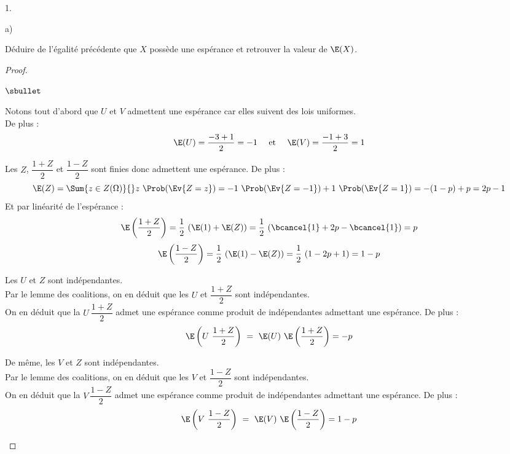\begin{noliste}{1.}
\begin{noliste}{a)}
    \newpage


  \item Déduire de l'égalité précédente que $X$ possède une espérance
    et retrouver la valeur de $\E(X)$.

    \begin{proof}~
      \begin{noliste}{$\sbullet$}
      \item Notons tout d'abord que $U$ et $V$ admettent une espérance
        car elles suivent des lois uniformes. \\
        De plus :
        \[
        \E(U) = \dfrac{-3 + 1}{2} = -1 \quad \text{ et } \quad \E(V) =
        \dfrac{-1 + 3}{2} = 1
        \]
      \item Les \var $Z$, $\dfrac{1+Z}{2}$ et $\dfrac{1-Z}{2}$ sont
        finies donc admettent une espérance. De plus :
        \[
        \E(Z) = \Sum{z \in Z(\Omega)}{} z \ \Prob(\Ev{Z = z}) = -1 \
        \Prob(\Ev{Z = -1}) + 1 \ \Prob(\Ev{Z = 1}) = -(1-p) + p = 2p-1
        \]
        Et par linéarité de l'espérance :
        \[
        \E\left(\dfrac{1+Z}{2}\right) = \dfrac{1}{2} \ (\E(1) + \E(Z)) =
        \dfrac{1}{2} \ (\bcancel{1} + 2p -\bcancel{1}) = p
        \]
        \[
        \E\left(\dfrac{1-Z}{2}\right) = \dfrac{1}{2} \ (\E(1) - \E(Z)) =
        \dfrac{1}{2} \ (1 - 2p + 1) = 1-p
        \]

      \item Les \var $U$ et $Z$ sont indépendantes.\\
        Par le lemme des coalitions, on en déduit que les \var $U$ et
        $\dfrac{1+Z}{2}$ sont indépendantes.\\
        On en déduit que la \var $U \ \dfrac{1+Z}{2}$ admet une
        espérance comme produit de \var indépendantes admettant une
        espérance. De plus : 
        \[
        \E\left(U \ \dfrac{1+Z}{2}\right) \ = \ \E(U) \
        \E\left(\dfrac{1+Z}{2}\right) = - p
        \]

      \item De même, les \var $V$ et $Z$ sont indépendantes.\\
        Par le lemme des coalitions, on en déduit que les \var $V$ et
        $\dfrac{1-Z}{2}$ sont indépendantes.\\
        On en déduit que la \var $V \ \dfrac{1-Z}{2}$ admet une
        espérance comme produit de \var indépendantes admettant une
        espérance. De plus : 
        \[
        \E\left(V \ \dfrac{1-Z}{2}\right) \ = \ \E(V) \
        \E\left(\dfrac{1-Z}{2}\right) = 1-p
        \]


\end{noliste}
\end{proof}
\end{noliste}
\end{noliste}
